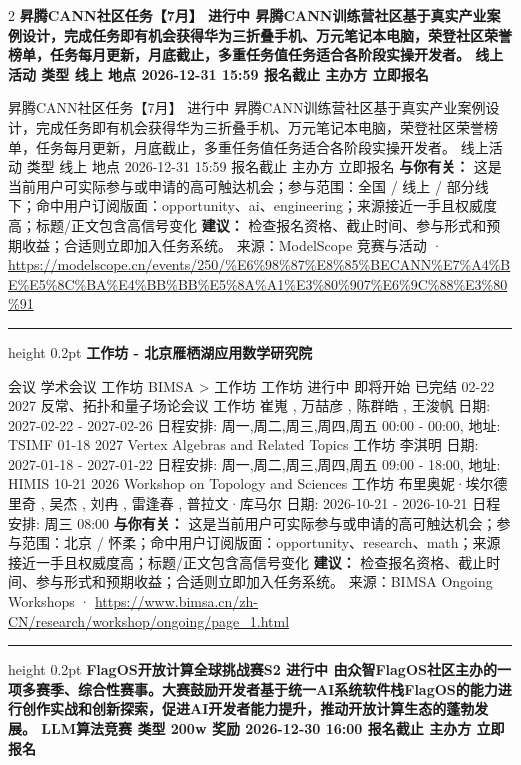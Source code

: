 \documentclass[10.5pt]{ctexart}
\begin{document}
\begin{multicols}{2}
{\large\bfseries 昇腾CANN社区任务【7月】 进行中 昇腾CANN训练营社区基于真实产业案例设计，完成任务即有机会获得华为三折叠手机、万元笔记本电脑，荣登社区荣誉榜单，任务每月更新，月底截止，多重任务值任务适合各阶段实操开发者。 线上活动 类型 线上 地点 2026-12-31 15:59 报名截止 主办方 立即报名}\par
昇腾CANN社区任务【7月】 进行中 昇腾CANN训练营社区基于真实产业案例设计，完成任务即有机会获得华为三折叠手机、万元笔记本电脑，荣登社区荣誉榜单，任务每月更新，月底截止，多重任务值任务适合各阶段实操开发者。 线上活动 类型 线上 地点 2026-12-31 15:59 报名截止 主办方 立即报名
\textbf{与你有关：} 这是当前用户可实际参与或申请的高可触达机会；参与范围：全国 / 线上 / 部分线下；命中用户订阅版面：opportunity、ai、engineering；来源接近一手且权威度高；标题/正文包含高信号变化
\textbf{建议：} 检查报名资格、截止时间、参与形式和预期收益；合适则立即加入任务系统。
{\footnotesize\color{ormuted} 来源：ModelScope 竞赛与活动 · \url{https://modelscope.cn/events/250/%E6%98%87%E8%85%BECANN%E7%A4%BE%E5%8C%BA%E4%BB%BB%E5%8A%A1%E3%80%907%E6%9C%88%E3%80%91}}
\vspace{2mm}
\hrule height 0.2pt
\vspace{2mm}
{\large\bfseries 工作坊 - 北京雁栖湖应用数学研究院}\par
会议 学术会议 工作坊 BIMSA > 工作坊 工作坊 进行中 即将开始 已完结 02-22 2027 反常、拓扑和量子场论会议 工作坊 崔嵬 , 万喆彦 , 陈群皓 , 王浚帆 日期: 2027-02-22 - 2027-02-26 日程安排: 周一,周二,周三,周四,周五 00:00 - 00:00, 地址: TSIMF 01-18 2027 Vertex Algebras and Related Topics 工作坊 李淇明 日期: 2027-01-18 - 2027-01-22 日程安排: 周一,周二,周三,周四,周五 09:00 - 18:00, 地址: HIMIS 10-21 2026 Workshop on Topology and Sciences 工作坊 布里奥妮·埃尔德里奇 , 吴杰 , 刘冉 , 雷逢春 , 普拉文·库马尔 日期: 2026-10-21 - 2026-10-21 日程安排: 周三 08:00
\textbf{与你有关：} 这是当前用户可实际参与或申请的高可触达机会；参与范围：北京 / 怀柔；命中用户订阅版面：opportunity、research、math；来源接近一手且权威度高；标题/正文包含高信号变化
\textbf{建议：} 检查报名资格、截止时间、参与形式和预期收益；合适则立即加入任务系统。
{\footnotesize\color{ormuted} 来源：BIMSA Ongoing Workshops · \url{https://www.bimsa.cn/zh-CN/research/workshop/ongoing/page_1.html}}
\vspace{2mm}
\hrule height 0.2pt
\vspace{2mm}
{\large\bfseries FlagOS开放计算全球挑战赛S2 进行中 由众智FlagOS社区主办的一项多赛季、综合性赛事。大赛鼓励开发者基于统一AI系统软件栈FlagOS的能力进行创作实战和创新探索，促进AI开发者能力提升，推动开放计算生态的蓬勃发展。 LLM算法竞赛 类型 200w 奖励 2026-12-30 16:00 报名截止 主办方 立即报名}\par

\end{multicols}
\end{document}
